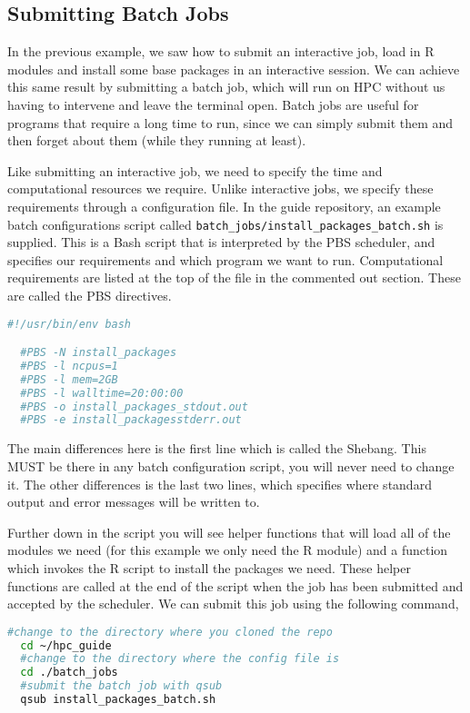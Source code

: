 \subsection{Submitting Batch Jobs}
In the previous example, we saw how to submit an interactive job, load in R modules and install some base packages in an interactive session. We can achieve this same result by submitting a batch job, which will run on HPC without us having to intervene and leave the terminal open. Batch jobs are useful for programs that require a long time to run, since we can simply submit them and then forget about them (while they running at least).
%
\par
% 
%
Like submitting an interactive job, we need to specify the time and computational resources we require. Unlike interactive jobs, we specify these requirements through a configuration file. In the guide repository, an example batch configurations script called \texttt{batch\_jobs/install\_packages\_batch.sh} is supplied. This is a Bash script that is interpreted by the PBS scheduler, and specifies our requirements and which program we want to run. Computational requirements are listed at the top of the file in the commented out section. These are called the PBS directives.
\begin{lstlisting}[language=bash, frame=single]
  #!/usr/bin/env bash

  #PBS -N install_packages
  #PBS -l ncpus=1
  #PBS -l mem=2GB
  #PBS -l walltime=20:00:00
  #PBS -o install_packages_stdout.out
  #PBS -e install_packagesstderr.out

\end{lstlisting}
%
%
The main differences here is the first line which is called the Shebang. This MUST be there in any batch configuration script, you will never need to change it. The other differences is the last two lines, which specifies where standard output and error messages will be written to.
%
%
\par
%
%
Further down in the script you will see helper functions that will load all of the modules we need (for this example we only need the R module) and a function which invokes the R script to install the packages we need. These helper functions are called at the end of the script when the job has been submitted and accepted by the scheduler. We can submit this job using the following command,
%
%
\begin{lstlisting}[language=bash, frame=single]
  #change to the directory where you cloned the repo
  cd ~/hpc_guide
  #change to the directory where the config file is
  cd ./batch_jobs
  #submit the batch job with qsub
  qsub install_packages_batch.sh
\end{lstlisting}
